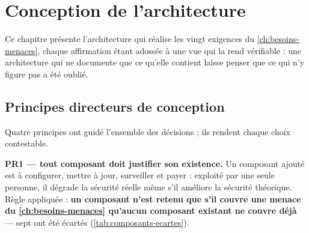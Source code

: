 \setlength{\textfloatsep}{10pt plus 2pt minus 3pt}
\setlength{\floatsep}{8pt plus 2pt minus 2pt}
\setlength{\intextsep}{8pt plus 2pt minus 2pt}
\setlength{\abovecaptionskip}{4pt}
\setlength{\belowcaptionskip}{2pt}
\renewcommand{\topfraction}{0.92}
\renewcommand{\bottomfraction}{0.75}
\renewcommand{\textfraction}{0.08}
\renewcommand{\floatpagefraction}{0.88}
\setcounter{topnumber}{3}
\setcounter{totalnumber}{4}

\chapter{Conception de l'architecture}
\label{ch:conception}

Ce chapitre présente l'architecture qui réalise les vingt exigences du \cref{ch:besoins-menaces}, chaque
affirmation étant adossée à une vue qui la rend vérifiable : une architecture qui ne documente que
ce qu'elle contient laisse penser que ce qui n'y figure pas a été oublié.

\section{Principes directeurs de conception}

Quatre principes ont guidé l'ensemble des décisions ; ils rendent chaque choix contestable.

\textbf{PR1 --- tout composant doit justifier son existence.} Un composant ajouté est à configurer,
mettre à jour, surveiller et payer : exploité par une seule personne, il dégrade la sécurité réelle
même s'il améliore la sécurité théorique. Règle appliquée : \textbf{un composant n'est retenu que
s'il couvre une menace du \cref{ch:besoins-menaces} qu'aucun composant existant ne couvre déjà} --- sept ont été
écartés (\cref{tab:composants-ecartes}).

